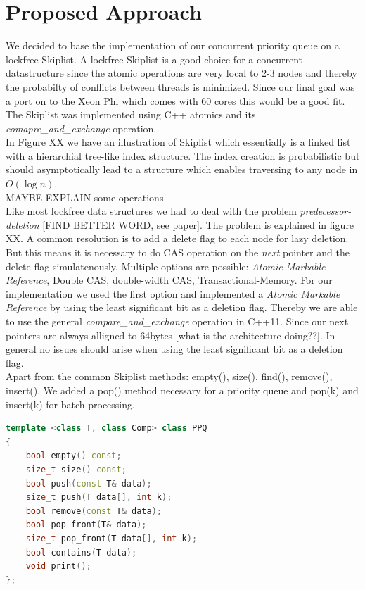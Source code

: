 \section{Proposed Approach}\label{sec:approach}

We decided to base the implementation of our concurrent priority queue on a lockfree Skiplist. A lockfree Skiplist is a good choice for a concurrent datastructure since the atomic operations are very local to 2-3 nodes and thereby the probabilty of conflicts between threads is minimized. Since our final goal was a port on to the Xeon Phi which comes with 60 cores this would be a good fit.\\
The Skiplist was implemented using C++ atomics and its {\em comapre\_and\_exchange} operation.\\
In Figure XX we have an illustration of Skiplist which essentially is a linked list with a hierarchial tree-like index structure. The index creation is probabilistic but should asymptotically lead to a structure which enables traversing to any node in $O(\log n)$.\\
MAYBE EXPLAIN some operations\\
Like most lockfree data structures we had to deal with the problem {\em predecessor-deletion} [FIND BETTER WORD, see paper]. The problem is explained in figure XX.
A common resolution is to add a delete flag to each node for lazy deletion. But this means it is necessary to do CAS operation on the {\em next} pointer and the delete flag simulatenously. Multiple options are possible: {\em Atomic Markable Reference}, Double CAS, double-width CAS, Transactional-Memory. For our implementation we used the first option and implemented a {\em Atomic Markable Reference} by using the least significant bit as a deletion flag. Thereby we are able to use the general {\em compare\_and\_exchange} operation in C++11. Since our next pointers are always alligned to 64bytes [what is the architecture doing??]. In general no issues should arise when using the least significant bit as a deletion flag.\\
Apart from the common Skiplist methods: empty(), size(), find(), remove(), insert(). We added a pop() method necessary for a priority queue and pop(k) and insert(k) for batch processing.\\


\begin{lstlisting}[language=C++,basicstyle=\tt\footnotesize,captionpos=b,caption=PPQ interface,morekeywords={*, size_t}]
template <class T, class Comp> class PPQ
{
	bool empty() const;
	size_t size() const;
	bool push(const T& data);
	size_t push(T data[], int k);
	bool remove(const T& data);
	bool pop_front(T& data);
	size_t pop_front(T data[], int k);
	bool contains(T data);
	void print();
};
\end{lstlisting}


